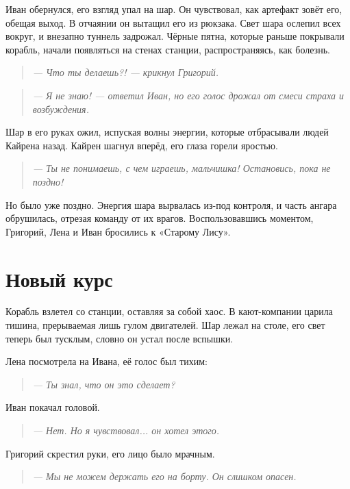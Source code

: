 \documentclass[12pt,a4paper]{book}
\newenvironment{dialogue}{\begin{quote}\itshape}{\end{quote}} %
\begin{document}
Иван обернулся, его взгляд упал на шар. Он чувствовал, как артефакт зовёт его, обещая выход. В отчаянии он вытащил его из рюкзака. Свет шара ослепил всех вокруг, и внезапно туннель задрожал. Чёрные пятна, которые раньше покрывали корабль, начали появляться на стенах станции, распространяясь, как болезнь.

\begin{dialogue}
--- Что ты делаешь?! --- крикнул Григорий.
\end{dialogue}

\begin{dialogue}
--- Я не знаю! --- ответил Иван, но его голос дрожал от смеси страха и возбуждения.
\end{dialogue}

Шар в его руках ожил, испуская волны энергии, которые отбрасывали людей Кайрена назад. Кайрен шагнул вперёд, его глаза горели яростью.

\begin{dialogue}
--- Ты не понимаешь, с чем играешь, мальчишка! Остановись, пока не поздно!
\end{dialogue}

Но было уже поздно. Энергия шара вырвалась из-под контроля, и часть ангара обрушилась, отрезая команду от их врагов. Воспользовавшись моментом, Григорий, Лена и Иван бросились к «Старому Лису».

\section*{Новый курс}

Корабль взлетел со станции, оставляя за собой хаос. В кают-компании царила тишина, прерываемая лишь гулом двигателей. Шар лежал на столе, его свет теперь был тусклым, словно он устал после вспышки.

Лена посмотрела на Ивана, её голос был тихим:

\begin{dialogue}
--- Ты знал, что он это сделает?
\end{dialogue}

Иван покачал головой.

\begin{dialogue}
--- Нет. Но я чувствовал... он хотел этого.
\end{dialogue}

Григорий скрестил руки, его лицо было мрачным.

\begin{dialogue}
--- Мы не можем держать его на борту. Он слишком опасен.
\end{dialogue}
\end{document}
